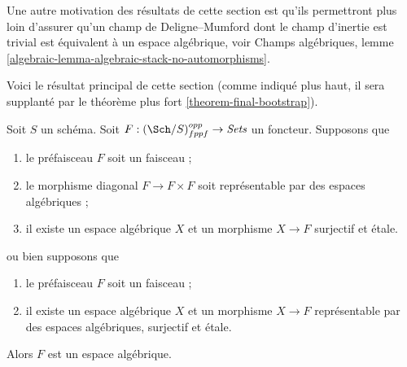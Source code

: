 \medskip\noindent
Une autre motivation des résultats de cette section est qu'ils permettront
plus loin d'assurer qu'un champ de Deligne--Mumford dont le champ d'inertie est
trivial est équivalent à un espace algébrique, voir
Champs algébriques, lemme \ref{algebraic-lemma-algebraic-stack-no-automorphisms}.

\medskip\noindent
Voici le résultat principal de cette section (comme indiqué plus haut, il
sera supplanté par le théorème plus fort
\ref{theorem-final-bootstrap}).

\begin{theorem}
\label{theorem-bootstrap}
Soit $S$ un schéma.
Soit $F : (\Sch/S)_{fppf}^{opp} \to \textit{Sets}$ un foncteur.
Supposons que
\begin{enumerate}
\item le préfaisceau $F$ soit un faisceau ;
\item le morphisme diagonal $F  \to F \times F$ soit représentable par
des espaces algébriques ;
\item il existe un espace algébrique $X$
et un morphisme $X \to F$ surjectif et étale.
\end{enumerate}
ou bien supposons que
\begin{enumerate}
\item[(a)] le préfaisceau $F$ soit un faisceau ;
\item[(b)] il existe un espace algébrique $X$ et un morphisme $X \to F$
représentable par des espaces algébriques, surjectif et étale.
\end{enumerate}
Alors $F$ est un espace algébrique.
\end{theorem}

